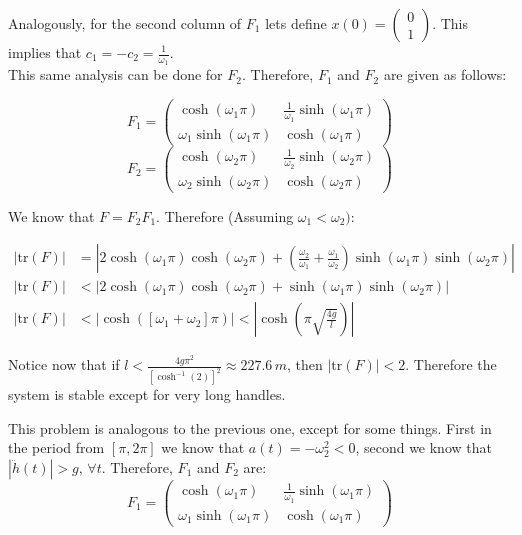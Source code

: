 \documentclass[
course = {{ITVO}},
quartile = {{1}},
assignment = 6,
name = {{Samir Salmen}},
studentnumber = {{NUSP: 11298636}},
email = {{samir.salmen@usp.br}},
firstexercise = 1
]{aga-homework}
\begin{document}
			Analogously, for the second column of $F_1$ lets define $x(0) = \begin{pmatrix}
				0\\
				1
			\end{pmatrix}$. This implies that $c_1 = -c_2 = \frac{1}{\omega_1}$.\\
			This same analysis can be done for $F_2$. Therefore, $F_1$ and $F_2$ are given as follows:
			
			\begin{equation}
				F_1 = \begin{pmatrix}\cosh(\omega_1\pi) & \frac{1}{\omega_1}\sinh(\omega_1\pi)\\ \omega_1\sinh(\omega_1\pi) &  \cosh(\omega_1\pi) \end{pmatrix}
			\end{equation}
			\begin{equation}
				F_2 = \begin{pmatrix}\cosh(\omega_2\pi) & \frac{1}{\omega_2}\sinh(\omega_2\pi)\\ \omega_2\sinh(\omega_2\pi) &  \cosh(\omega_2\pi) \end{pmatrix}
			\end{equation}
			
			We know that $F = F_2F_1$. Therefore (Assuming $\omega_1 < \omega_2)$:
			
			\begin{align}
				|\text{tr}(F)| &= |2\cosh(\omega_1\pi)\cosh(\omega_2\pi) + (\frac{\omega_2}{\omega_1} + \frac{\omega_1}{\omega_2})\sinh(\omega_1\pi)\sinh(\omega_2\pi)|\\
				|\text{tr}(F)| &< |2\cosh(\omega_1\pi)\cosh(\omega_2\pi) + \sinh(\omega_1\pi)\sinh(\omega_2\pi)|\\
				|\text{tr}(F)| &< \left|\cosh([\omega_1 + \omega_2]\pi)\right| < \left|\cosh(\pi\sqrt{\frac{4g}{l}})\right|
			\end{align}
			
			Notice now that if $l < \frac{4g\pi^2}{[\cosh^{-1}(2)]^2} \approx 227.6 \, m$, then $|\text{tr}(F)| < 2$. Therefore the system is stable except for very long handles.
			
		\subexercise
			This problem is analogous to the previous one, except for some things. First in the period from $[\pi, 2\pi]$ we know that $a(t) = -\omega_2^2 < 0$, second we know that $|\ddot{h}(t)| > g, \, \forall t$. Therefore, $F_1$ and $F_2$ are:
			\begin{equation}
				F_1 = \begin{pmatrix}\cosh(\omega_1\pi) & \frac{1}{\omega_1}\sinh(\omega_1\pi)\\ \omega_1\sinh(\omega_1\pi) &  \cosh(\omega_1\pi) \end{pmatrix}
			\end{equation}
		
\end{document}
